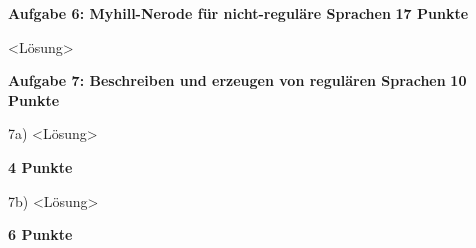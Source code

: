 \documentclass[twoside,10pt,fleqn,headinclude=false]{scrartcl}
\begin{document}
\textbf{Aufgabe 6: Myhill-Nerode für nicht-reguläre Sprachen} \hfill \textbf{17 Punkte}
\begin{compactenum}
	\item[] <Lösung>
\end{compactenum}

\newpage

\textbf{Aufgabe 7: Beschreiben und erzeugen von regulären Sprachen} \hfill \textbf{10 Punkte}
\begin{compactenum}
	\item[7a)] <Lösung>
	\item[] \hfill \textbf{4 Punkte}
	\item[7b)] <Lösung>
	\item[] \hfill \textbf{6 Punkte}

\end{compactenum}
\end{document}
